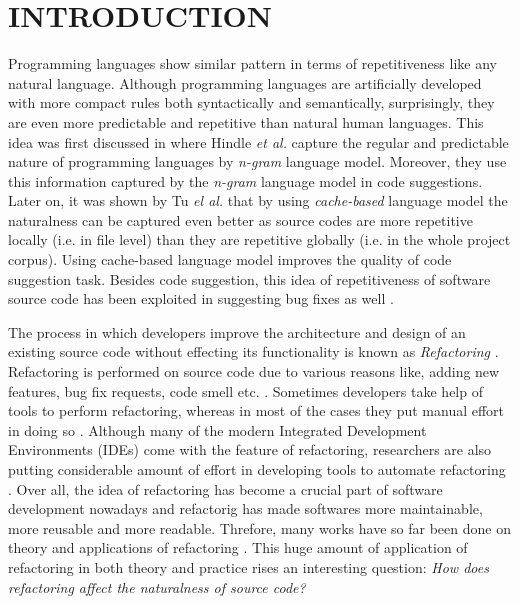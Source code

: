 \documentclass[conference]{IEEEtran}
\begin{document}
\section{INTRODUCTION} \label{Intro}

Programming languages show similar pattern in terms of repetitiveness like any natural language. Although programming languages are artificially developed with more compact rules both syntactically and semantically, surprisingly, they are even more predictable and repetitive than natural human languages. This idea was first discussed in \cite{Hindle} where Hindle \textit{et al.} capture the regular and predictable nature of programming languages by \textit{n-gram} language model. Moreover, they use this information captured by the \textit{n-gram} language model in code suggestions. Later on, it was shown by Tu \textit{el al.} \cite{Tu} that by using \textit{cache-based} language model the naturalness can be captured even better as source codes are more repetitive locally (i.e. in file level) than they are repetitive globally (i.e. in the whole project corpus). Using cache-based language model improves the quality of code suggestion task. Besides code suggestion, this idea of repetitiveness of software source code has been exploited in suggesting bug fixes as well \cite{Ray}.

The process in which developers improve the architecture and design of an existing source code without effecting its functionality is known as \textit{Refactoring} \cite{Opdyke}. Refactoring is performed on source code due to various reasons like, adding new features, bug fix requests, code smell etc. \cite{Silva}. Sometimes developers take help of tools to perform refactoring, whereas in most of the cases they put manual effort in doing so \cite{Murphy}\cite{Silva}. Although many of the modern Integrated Development Environments (IDEs) come with the feature of refactoring, researchers are also putting considerable amount of effort in developing tools to automate refactoring \cite{GailMurphy}\cite{Davood}. Over all, the idea of refactoring has become a crucial part of software development nowadays and refactorig has made softwares more maintainable, more reusable and more readable. Threfore, many works have so far been done on theory and applications of refactoring \cite{Zibran}\cite{Mondal}\cite{Fokaefs}\cite{Tsantalis}. This huge amount of application of refactoring in both theory and practice rises an interesting question: \textit{How does refactoring affect the naturalness of source code?}
\end{document}
